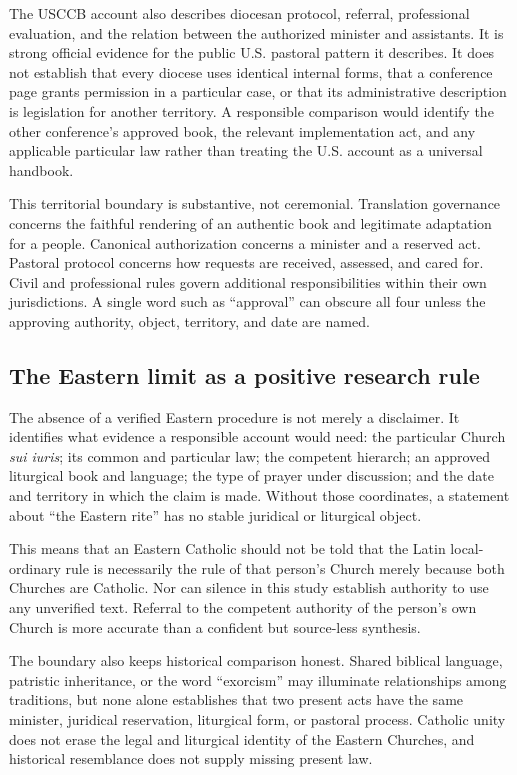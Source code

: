 The USCCB account also describes diocesan protocol, referral, professional
evaluation, and the relation between the authorized minister and assistants.
It is strong official evidence for the public U.S. pastoral pattern it
describes. It does not establish that every diocese uses identical internal
forms, that a conference page grants permission in a particular case, or that
its administrative description is legislation for another territory. A
responsible comparison would identify the other conference's approved book,
the relevant implementation act, and any applicable particular law rather
than treating the U.S. account as a universal handbook.

This territorial boundary is substantive, not ceremonial. Translation
governance concerns the faithful rendering of an authentic book and legitimate
adaptation for a people. Canonical authorization concerns a minister and a
reserved act. Pastoral protocol concerns how requests are received, assessed,
and cared for. Civil and professional rules govern additional responsibilities
within their own jurisdictions. A single word such as ``approval'' can obscure
all four unless the approving authority, object, territory, and date are
named.

\subsection{The Eastern limit as a positive research rule}

The absence of a verified Eastern procedure is not merely a disclaimer. It
identifies what evidence a responsible account would need: the particular
Church \emph{sui iuris}; its common and particular law; the competent hierarch;
an approved liturgical book and language; the type of prayer under discussion;
and the date and territory in which the claim is made. Without those
coordinates, a statement about ``the Eastern rite'' has no stable juridical or
liturgical object.

This means that an Eastern Catholic should not be told that the Latin
local-ordinary rule is necessarily the rule of that person's Church merely
because both Churches are Catholic. Nor can silence in this study establish
authority to use any unverified text. Referral to the competent authority of
the person's own Church is more accurate than a confident but source-less
synthesis.

The boundary also keeps historical comparison honest. Shared biblical
language, patristic inheritance, or the word ``exorcism'' may illuminate
relationships among traditions, but none alone establishes that two present
acts have the same minister, juridical reservation, liturgical form, or
pastoral process. Catholic unity does not erase the legal and liturgical
identity of the Eastern Churches, and historical resemblance does not supply
missing present law.


